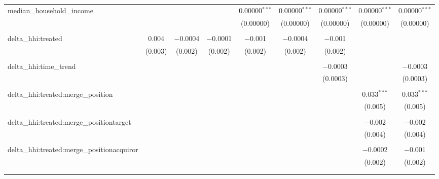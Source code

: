 \begin{table}[H]
{\begin{tabular}{@{\extracolsep{5pt}}lcccccccc}
  median\_household\_income &  &  &  & 0.00000$^{***}$ & 0.00000$^{***}$ & 0.00000$^{***}$ & 0.00000$^{***}$ & 0.00000$^{***}$ \\  

   &  &  &  & (0.00000) & (0.00000) & (0.00000) & (0.00000) & (0.00000) \\  

   & & & & & & & & \\  

  delta\_hhi:treated & 0.004 & $-$0.0004 & $-$0.0001 & $-$0.001 & $-$0.0004 & $-$0.001 &  &  \\  

   & (0.003) & (0.002) & (0.002) & (0.002) & (0.002) & (0.002) &  &  \\  

   & & & & & & & & \\  

  delta\_hhi:time\_trend &  &  &  &  &  & $-$0.0003 &  & $-$0.0003 \\  

   &  &  &  &  &  & (0.0003) &  & (0.0003) \\  

   & & & & & & & & \\  

  delta\_hhi:treated:merge\_position &  &  &  &  &  &  & 0.033$^{***}$ & 0.033$^{***}$ \\  

   &  &  &  &  &  &  & (0.005) & (0.005) \\  

   & & & & & & & & \\  

  delta\_hhi:treated:merge\_positiontarget &  &  &  &  &  &  & $-$0.002 & $-$0.002 \\  

   &  &  &  &  &  &  & (0.004) & (0.004) \\  

   & & & & & & & & \\  

  delta\_hhi:treated:merge\_positionacquiror &  &  &  &  &  &  & $-$0.0002 & $-$0.001 \\  

   &  &  &  &  &  &  & (0.002) & (0.002) \\  

   & & & & & & & & \\  

 \hline \\[-1.8ex]  


\end{tabular}}
\end{table}
